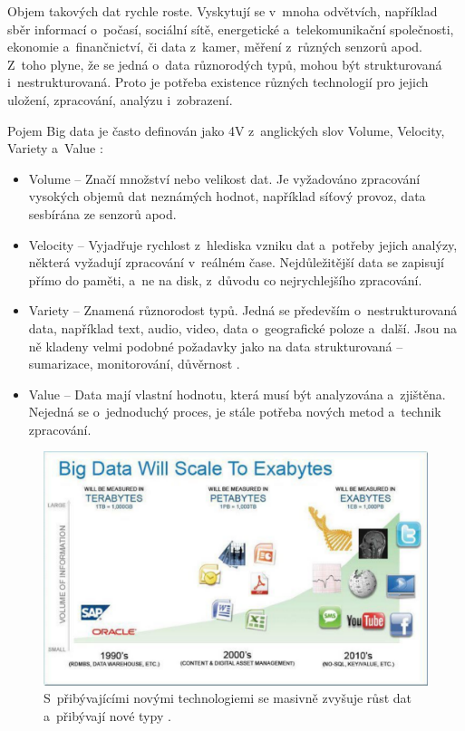 Objem takových dat rychle roste. Vyskytují se v~mnoha odvětvích, například sběr informací o~počasí, sociální sítě, energetické a~telekomunikační společnosti, ekonomie a~finančnictví, či data z~kamer, měření z~různých senzorů apod. Z~toho plyne, že se jedná o~data různorodých typů, mohou být strukturovaná i~nestrukturovaná. Proto je potřeba existence různých technologií pro jejich uložení, zpracování, analýzu i~zobrazení.

\vspace{0.5cm}

\noindent Pojem Big data je často definován jako 4V z~anglických slov Volume, Velocity, Variety a~Value \cite{oracleBigData}:

\begin{itemize}
\item Volume -- Značí množství nebo velikost dat. Je vyžadováno zpracování vysokých objemů dat neznámých hodnot, například síťový provoz, data sesbírána ze senzorů apod.

\item Velocity -- Vyjadřuje rychlost z~hlediska vzniku dat a~potřeby jejich analýzy, některá vyžadují zpracování v~reálném čase. Nejdůležitější data se zapisují přímo do paměti, a~ne na disk, z~důvodu co nejrychlejšího zpracování.

\item Variety -- Znamená různorodost typů. Jedná se především o~nestrukturovaná data, například text, audio, video, data o~geografické poloze a~další. Jsou na ně kladeny velmi podobné požadavky jako na data strukturovaná – sumarizace, monitorování, důvěrnost \cite{oracleBigData}.

\item Value -- Data mají vlastní hodnotu, která musí být analyzována a~zjištěna. Nejedná se o~jednoduchý proces, je stále potřeba nových metod a~technik zpracování.
\end{itemize}

\begin{figure}[!h]
  \centering
  \includegraphics[width=15cm]{template-fig/big_data_exabytes.pdf}
  \caption{S~přibývajícími novými technologiemi se masivně zvyšuje růst dat a~přibývají nové typy \cite{rajeshBigData}.}
  \label{FIG_BigDataExabytes}
\end{figure}

